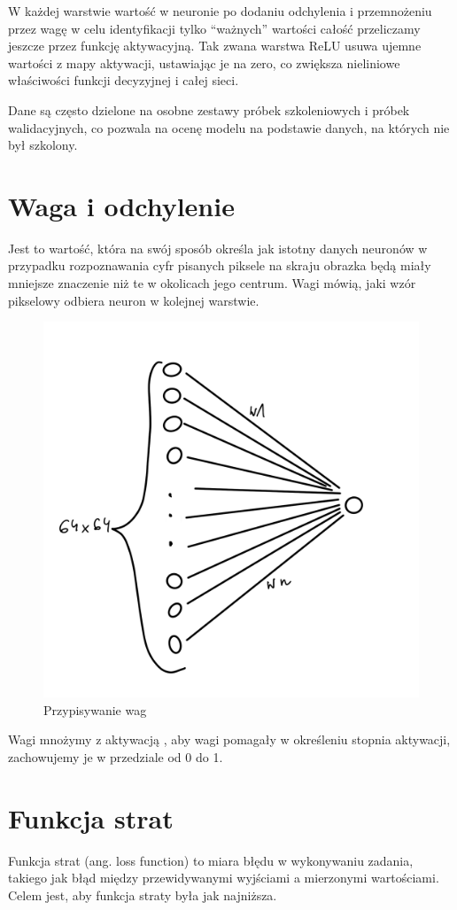 \documentclass[brudnopis]{xmgr}
\begin{document}
W każdej warstwie  wartość w neuronie po dodaniu odchylenia i przemnożeniu przez wagę w celu identyfikacji tylko “ważnych” wartości całość przeliczamy jeszcze przez funkcję aktywacyjną. 
Tak zwana warstwa ReLU usuwa ujemne wartości z mapy aktywacji, ustawiając je na zero, co zwiększa nieliniowe właściwości funkcji decyzyjnej i całej sieci.




Dane są często dzielone na osobne zestawy próbek szkoleniowych i próbek walidacyjnych, co pozwala na ocenę modelu na podstawie danych, na których nie był szkolony.


\section{Waga i odchylenie \label{s:dsssl}}
Jest to wartość, która na swój sposób określa jak istotny danych neuronów w przypadku rozpoznawania cyfr pisanych piksele na skraju obrazka będą miały mniejsze znaczenie niż te w okolicach jego centrum. Wagi mówią, jaki wzór pikselowy odbiera neuron w kolejnej warstwie.

\begin{figure}[!tbh]
\centering
\includegraphics[width=.8\hsize]{fig/3}
\caption{Przypisywanie wag\label{RYS.3}}
\end{figure}


 Wagi mnożymy z aktywacją ,  aby wagi pomagały w określeniu stopnia aktywacji, zachowujemy je w przedziale od 0 do 1.
 
 \section{Funkcja strat \label{s:dsssl}}
Funkcja strat (ang. loss function) to miara błędu w wykonywaniu zadania, takiego jak błąd między przewidywanymi wyjściami a mierzonymi wartościami. Celem jest, aby funkcja straty była jak najniższa.
 
\end{document}
